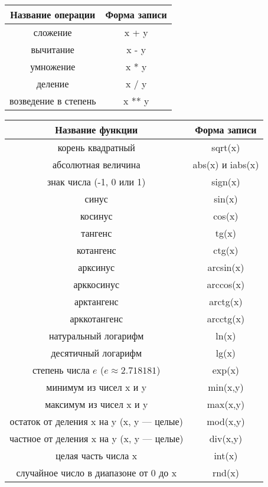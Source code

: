 \begin{center}
\begin{tabular}{||c|c||}
\hline
\hline
\textbf{Название операции} &
\textbf{Форма записи} \\
\hline
сложение &
x + y\\
вычитание &
x - y\\
умножение &
x * y\\
деление &
x / y\\
возведение в степень &
x ** y\\
\hline
\hline
\end{tabular}

\begin{tabular}{||c|c||}
\hline
\hline
\textbf{Название функции} &
\textbf{Форма записи} \\
\hline
корень квадратный &
sqrt(x) \\
абсолютная величина &
abs(x) и iabs(x)\\
знак числа (-1, 0 или 1) &
sign(x) \\
синус &
sin(x) \\
косинус &
cos(x) \\
тангенс &
tg(x) \\
котангенс &
ctg(x) \\
арксинус &
arcsin(x) \\
арккосинус &
arccos(x) \\
арктангенс &
arctg(x) \\
арккотангенс &
arcctg(x) \\
натуральный логарифм &
ln(x) \\
десятичный логарифм &
lg(x) \\
степень числа $e$ ($e \approx 2.718181$) &
exp(x) \\
минимум из чисел x и y &
min(x,y) \\
максимум из чисел x и y &
max(x,y) \\
остаток от деления x на y (x, y --- целые) &
mod(x,y) \\
частное от деления x на y (x, y --- целые) &
div(x,y) \\
целая часть числа x &
int(x) \\
случайное число в диапазоне от 0 до x &
rnd(x) \\
\hline
\hline
\end{tabular}
\end{center}

